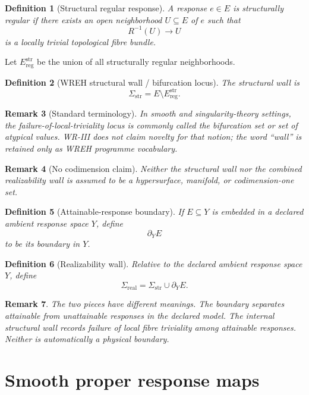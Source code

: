 \documentclass[11pt]{article}
\newtheorem{definition}{Definition}[section]
\newtheorem{remark}[definition]{Remark}
\begin{document}
\begin{definition}[Structural regular response]
A response \(e\in E\) is structurally regular if there exists an open
neighborhood \(U\subseteq E\) of \(e\) such that
\[
R^{-1}(U)\to U
\]
is a locally trivial topological fibre bundle.
\end{definition}

Let \(E_{\mathrm{reg}}^{\mathrm{str}}\) be the union of all structurally regular
neighborhoods.

\begin{definition}[WREH structural wall / bifurcation locus]
The structural wall is
\[
\Sigma_{\mathrm{str}}
=
E\setminus E_{\mathrm{reg}}^{\mathrm{str}}.
\]
\end{definition}

\begin{remark}[Standard terminology]
In smooth and singularity-theory settings, the failure-of-local-triviality
locus is commonly called the bifurcation set or set of atypical values.
WR-III does not claim novelty for that notion; the word ``wall'' is retained
only as WREH programme vocabulary.
\end{remark}

\begin{remark}[No codimension claim]
Neither the structural wall nor the combined realizability wall is assumed to
be a hypersurface, manifold, or codimension-one set.
\end{remark}
\begin{definition}[Attainable-response boundary]
If \(E\subseteq Y\) is embedded in a declared ambient response space \(Y\),
define
\[
\partial_YE
\]
to be its boundary in \(Y\).
\end{definition}

\begin{definition}[Realizability wall]
Relative to the declared ambient response space \(Y\), define
\[
\Sigma_{\mathrm{real}}
=
\Sigma_{\mathrm{str}}\cup\partial_YE.
\]
\end{definition}

\begin{remark}
The two pieces have different meanings. The boundary separates attainable
from unattainable responses in the declared model. The internal structural
wall records failure of local fibre triviality among attainable responses.
Neither is automatically a physical boundary.
\end{remark}

\section{Smooth proper response maps}
\end{document}
